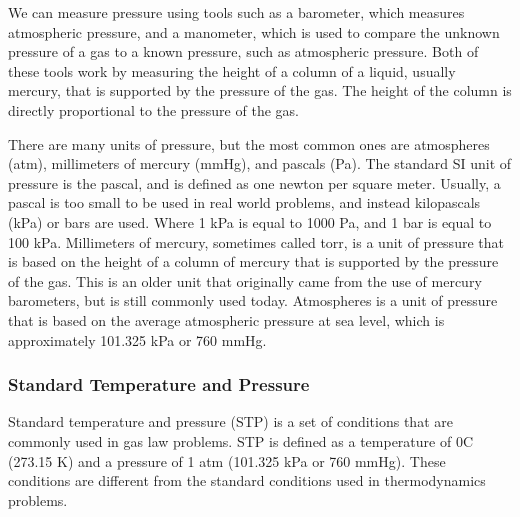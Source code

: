 We can measure pressure using tools such as a barometer, which measures atmospheric pressure, and a manometer, which is used to compare the unknown pressure of a gas to a known pressure, such as atmospheric pressure. Both of these tools work by measuring the height of a column of a liquid, usually mercury, that is supported by the pressure of the gas. The height of the column is directly proportional to the pressure of the gas. 

There are many units of pressure, but the most common ones are atmospheres (atm), millimeters of mercury (mmHg), and pascals (Pa). The standard SI unit of pressure is the pascal, and is defined as one newton per square meter. Usually, a pascal is too small to be used in real world problems, and instead kilopascals (kPa) or bars are used. Where 1 kPa is equal to 1000 Pa, and 1 bar is equal to 100 kPa. Millimeters of mercury, sometimes called torr, is a unit of pressure that is based on the height of a column of mercury that is supported by the pressure of the gas. This is an older unit that originally came from the use of mercury barometers, but is still commonly used today. Atmospheres is a unit of pressure that is based on the average atmospheric pressure at sea level, which is approximately 101.325 kPa or 760 mmHg.
\subsubsection{Standard Temperature and Pressure}
Standard temperature and pressure (STP) is a set of conditions that are commonly used in gas law problems. STP is defined as a temperature of 0\textdegree C (273.15 K) and a pressure of 1 atm (101.325 kPa or 760 mmHg). These conditions are different from the standard conditions used in thermodynamics problems.
